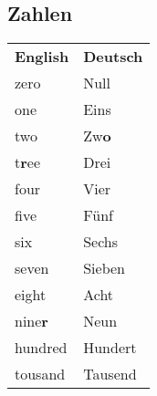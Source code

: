 
\subsection{Zahlen}
\begin{table}[H]
	\begin{tabularx}{\textwidth}{XX}
		\textbf{English} & \textbf{Deutsch} \\
		zero             & Null             \\
		one              & Eins             \\
		two              & Zw\textbf{o}     \\
		t\textbf{r}ee    & Drei             \\
		four             & Vier             \\
		five             & Fünf             \\
		six              & Sechs            \\
		seven            & Sieben           \\
		eight            & Acht             \\
		nine\textbf{r}   & Neun             \\
		hundred          & Hundert          \\
		tousand          & Tausend         
	\end{tabularx}%
\end{table}

